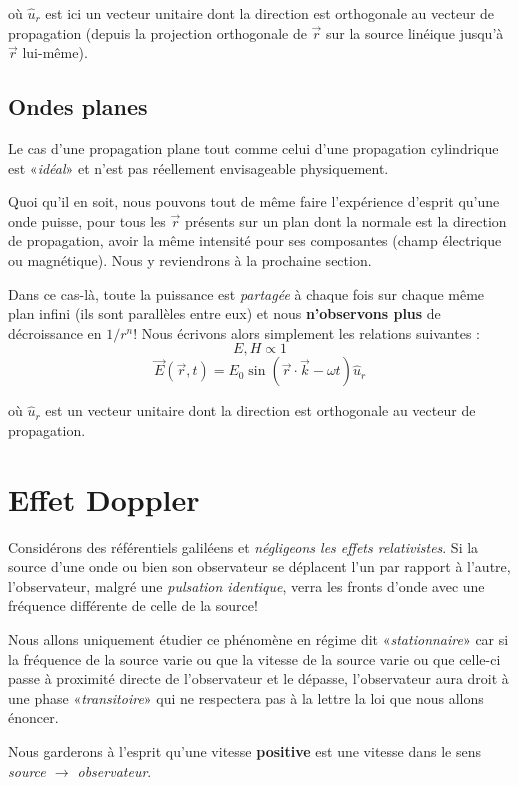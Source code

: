 où $\hat{u}_{r}$ est ici un vecteur unitaire dont la direction est orthogonale au vecteur de propagation (depuis la projection orthogonale de $\vec{r}$ sur la source linéique jusqu'à $\vec{r}$ lui-même).


\subsection{Ondes planes} 

Le cas d'une propagation plane tout comme celui d'une propagation cylindrique est «\textit{idéal}» et n'est pas réellement envisageable physiquement.

Quoi qu'il en soit, nous pouvons tout de même faire l'expérience d'esprit qu'une onde puisse, pour tous les $\vec{r}$ présents sur un plan dont la normale est la direction 
de propagation, avoir la même intensité pour ses composantes (champ électrique ou magnétique). Nous y reviendrons à la prochaine section.

Dans ce cas-là, toute la puissance est \textit{partagée} à chaque fois sur chaque même plan infini (ils sont parallèles entre eux) et nous \textbf{n'observons plus} de décroissance 
en $1/r^{n}$! Nous écrivons alors simplement les relations suivantes : 
\[E,H \propto 1\]
\[\vec{E}(\vec{r},t) = E_{0} \sin(\vec{r}\cdot \vec{k}-\omega t) \hat{u}_{r}\]

où $\hat{u}_{r}$ est un vecteur unitaire dont la direction est orthogonale au vecteur de propagation.

\section{Effet Doppler}

Considérons des référentiels galiléens et \textit{négligeons les effets relativistes}. 
Si la source d'une onde ou bien son observateur se déplacent l'un par rapport à l'autre, l'observateur, malgré une \textit{pulsation identique}, verra les fronts d'onde avec une fréquence différente de celle de la source!

Nous allons uniquement étudier ce phénomène en régime dit «\textit{stationnaire}» car si la fréquence de la source varie ou que la vitesse de la source varie ou que celle-ci 
passe à proximité directe de l'observateur et le dépasse, l'observateur aura droit à une phase «\textit{transitoire}» qui ne respectera pas à la lettre la loi que nous allons énoncer.

Nous garderons à l'esprit qu'une vitesse \textbf{positive} est une vitesse dans le sens \textit{source $\rightarrow$ observateur}.

